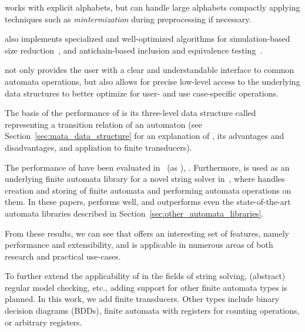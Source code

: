\mata works with explicit alphabets, but can handle large alphabets compactly applying techniques such as \emph{mintermization} during preprocessing if necessary.

\mata also implements specialized and well-optimized algorithms for simulation-based size reduction~\cite{ranzato_efficient_2010, treesimulation08}, and antichain-based inclusion and equivalence testing~\cite{doyen-antichain-10}.

\mata not only provides the user with a clear and understandable interface to common automata operations, but also allows for precise low-level access to the underlying data structures to better optimize for user- and use case-specific operations.

The basis of the performance of \mata is its three-level data structure called \deltastruct representing a transition relation of an automaton (see Section~\ref{sec:mata_data_structure} for an explanation of \deltastruct, its advantages and disadvantages, and appliation to finite transducers).

The performance of \mata have been evaluated in~\cite{cade23_reasoning_regular_properties_comparision_DBLP:conf/cade/FiedorHHRSV23} (as \enfa), \cite{tacas24_mata_10.1007/978-3-031-57249-4_7}.
Furthermore, \mata is used as an underlying finite automata library for a novel string solver \noodler in~\cite{fm23_equations_synergy_regular_constraints_DBLP:conf/fm/BlahoudekCCHHLS23, oopsla23_stabilization_DBLP:journals/pacmpl/ChenCHHLS23,tacas24_noodler_10.1007/978-3-031-57246-3_2}, where \mata handles creation and storing of finite automata and performing automata operations on them.
In these papers, \mata performs well, and outperforms even the state-of-the-art automata libraries described in Section~\ref{sec:other_automata_libraries}.

From these results, we can see that \mata offers an interesting set of features, namely performance and extensibility, and is applicable in numerous areas of both research and practical use-cases.

To further extend the applicability of \mata in the fields of string solving, (abstract) regular model checking, etc., adding support for other finite automata types is planned.
In this work, we add finite transducers.
Other types include binary decision diagrams (BDDs), finite automata with registers for counting operations, or arbitrary registers.



